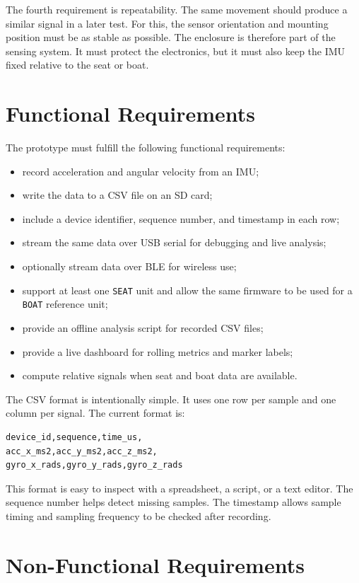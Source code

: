 The fourth requirement is repeatability. The same movement should produce a similar signal in a later test. For this, the sensor orientation and mounting position must be as stable as possible. The enclosure is therefore part of the sensing system. It must protect the electronics, but it must also keep the IMU fixed relative to the seat or boat.

\section{Functional Requirements}

The prototype must fulfill the following functional requirements:

\begin{itemize}
  \item record acceleration and angular velocity from an IMU;
  \item write the data to a CSV file on an SD card;
  \item include a device identifier, sequence number, and timestamp in each row;
  \item stream the same data over USB serial for debugging and live analysis;
  \item optionally stream data over BLE for wireless use;
  \item support at least one \texttt{SEAT} unit and allow the same firmware to be used for a \texttt{BOAT} reference unit;
  \item provide an offline analysis script for recorded CSV files;
  \item provide a live dashboard for rolling metrics and marker labels;
  \item compute relative signals when seat and boat data are available.
\end{itemize}

The CSV format is intentionally simple. It uses one row per sample and one column per signal. The current format is:

\begin{verbatim}
device_id,sequence,time_us,
acc_x_ms2,acc_y_ms2,acc_z_ms2,
gyro_x_rads,gyro_y_rads,gyro_z_rads
\end{verbatim}

This format is easy to inspect with a spreadsheet, a script, or a text editor. The sequence number helps detect missing samples. The timestamp allows sample timing and sampling frequency to be checked after recording.

\section{Non-Functional Requirements}

